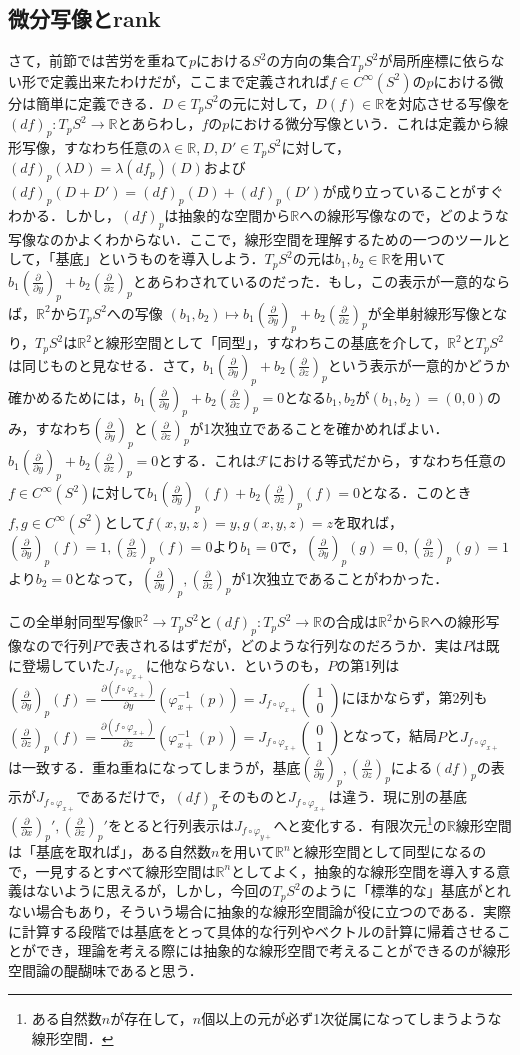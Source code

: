 \documentclass{jsarticle}
\def\vecb{\begin{pmatrix}}
\def\vece{\end{pmatrix}}
\def\realnum{{\mathbb R}}
\def\dfrac{\displaystyle\frac}
\def\delxp{\left(\dfrac{\partial}{\partial x}\right)_p}
\def\delyp{\left(\dfrac{\partial}{\partial y}\right)_p}
\def\delzp{\left(\dfrac{\partial}{\partial z}\right)_p}
\begin{document}
\subsection{微分写像とrank}
さて，前節では苦労を重ねて$p$における$S^2$の方向の集合$T_pS^2$が局所座標に依らない形で定義出来たわけだが，ここまで定義されれば$f\in C^{\infty}(S^2)$の$p$における微分は簡単に定義できる．$D\in T_pS^2$の元に対して，$D(f)\in \realnum$を対応させる写像を$(df)_p:T_pS^2\rightarrow \realnum$とあらわし，$f$の$p$における微分写像という．これは定義から線形写像，すなわち任意の$\lambda\in\realnum, D,D'\in T_pS^2$に対して，$(df)_p(\lambda D)=\lambda (df_p)(D)$および$(df)_p(D+D')=(df)_p(D)+(df)_p(D')$が成り立っていることがすぐわかる．しかし，$(df)_p$は抽象的な空間から$\realnum$への線形写像なので，どのような写像なのかよくわからない．ここで，線形空間を理解するための一つのツールとして，「基底」というものを導入しよう．$T_pS^2$の元は$b_1,b_2\in\realnum$を用いて$b_1\delyp+b_2\delzp$とあらわされているのだった．もし，この表示が一意的ならば，$\realnum^2$から$T_pS^2$への写像
$(b_1,b_2)\mapsto b_1\delyp+b_2\delzp$が全単射線形写像となり，$T_pS^2$は$\realnum^2$と線形空間として「同型」，すなわちこの基底を介して，$\realnum^2$と$T_pS^2$は同じものと見なせる．さて，$b_1\delyp+b_2\delzp$という表示が一意的かどうか確かめるためには，$b_1\delyp+b_2\delzp=0$となる$b_1,b_2$が$(b_1,b_2)=(0,0)$のみ，すなわち$\delyp$と$\delzp$が1次独立であることを確かめればよい．$b_1\delyp+b_2\delzp=0$とする．これは$\mathcal F$における等式だから，すなわち任意の$f\in C^{\infty}(S^2)$に対して$b_1\delyp(f)+b_2\delzp(f)=0$となる．このとき$f,g\in C^{\infty}(S^2)$として$f(x,y,z)=y,g(x,y,z)=z$を取れば，$\delyp(f)=1,\delzp(f)=0$より$b_1=0$で，$\delyp(g)=0,\delzp(g)=1$より$b_2=0$となって，$\delyp,\delzp$が1次独立であることがわかった．


この全単射同型写像$\realnum^2\rightarrow T_pS^2$と$(df)_p:T_pS^2\rightarrow \realnum$の合成は$\realnum^2$から$\realnum$への線形写像なので行列$P$で表されるはずだが，どのような行列なのだろうか．実は$P$は既に登場していた$J_{f\circ\varphi_{x+}}$に他ならない．というのも，$P$の第1列は$\delyp(f)=\dfrac{\partial (f\circ\varphi_{x+})}{\partial y}(\varphi_{x+}^{-1}(p))=J_{f\circ\varphi_{x+}}\vecb 1 \\ 0\vece$にほかならず，第2列も$\delzp(f)=\dfrac{\partial (f\circ\varphi_{x+})}{\partial z}(\varphi_{x+}^{-1}(p))=J_{f\circ\varphi_{x+}}\vecb 0 \\ 1 \vece$となって，結局$P$と$J_{f\circ\varphi_{x+}}$は一致する．重ね重ねになってしまうが，基底$\delyp,\delzp$による$(df)_p$の表示が$J_{f\circ\varphi_{x+}}$であるだけで，$(df)_p$そのものと$J_{f\circ\varphi_{x+}}$は違う．現に別の基底$\delxp',\delzp'$をとると行列表示は$J_{f\circ\varphi_{y+}}$へと変化する．有限次元\footnote{ある自然数$n$が存在して，$n$個以上の元が必ず1次従属になってしまうような線形空間．}の$\realnum$線形空間は「基底を取れば」，ある自然数$n$を用いて$\realnum^n$と線形空間として同型になるので，一見するとすべて線形空間は$\realnum^n$としてよく，抽象的な線形空間を導入する意義はないように思えるが，しかし，今回の$T_pS^2$のように「標準的な」基底がとれない場合もあり，そういう場合に抽象的な線形空間論が役に立つのである．実際に計算する段階では基底をとって具体的な行列やベクトルの計算に帰着させることができ，理論を考える際には抽象的な線形空間で考えることができるのが線形空間論の醍醐味であると思う．
\end{document}
